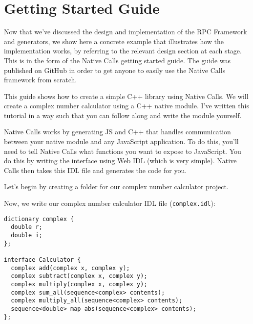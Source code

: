 \section{Getting Started Guide} %
\label{sec:end_to_end_example}
Now that we've discussed the design and implementation of the RPC Framework and generators, we show here a concrete example that illustrates how the implementation works, by referring to the relevant design section at each stage. This is in the form of the Native Calls getting started guide. The guide was published on GitHub in order to get anyone to easily use the Native Calls framework from scratch.

This guide shows how to create a simple C++ library using Native Calls.
We will create a complex number calculator using a C++ native module.
I've written this tutorial in a way such that you can follow along and
write the module yourself.


Native Calls works by generating JS and C++ that handles communication
between your native module and any JavaScript application. To do this,
you'll need to tell Native Calls what functions you want to expose to
JavaScript. You do this by writing the interface using Web IDL (which is
very simple). Native Calls then takes this IDL file and generates the
code for you.

Let's begin by creating a folder for our complex number calculator
project.

\begin{Shaded}
\begin{Highlighting}[]
 
 
 
\end{Highlighting}
\end{Shaded}

Now, we write our complex number calculator IDL file
(\texttt{complex.idl}):

\begin{verbatim}
dictionary complex {
  double r;
  double i;
};

interface Calculator {
  complex add(complex x, complex y);
  complex subtract(complex x, complex y);
  complex multiply(complex x, complex y);
  complex sum_all(sequence<complex> contents);
  complex multiply_all(sequence<complex> contents);
  sequence<double> map_abs(sequence<complex> contents);
};
\end{verbatim}

